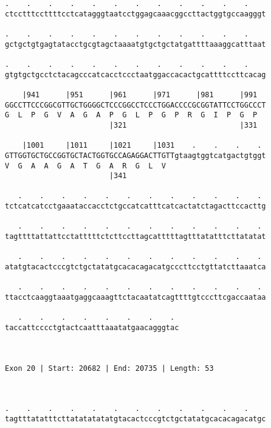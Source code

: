 \documentclass{article}
\begin{document}
\begin{Verbatim}
.    .    .    .    .    .    .    .    .    .    .    .    
ctcctttccttttcctcatagggtaatcctggagcaaacggccttactggtgccaagggt
                                                            
.    .    .    .    .    .    .    .    .    .    .    .    
gctgctgtgagtatacctgcgtagctaaaatgtgctgctatgattttaaaggcatttaat
                                                            
.    .    .    .    .    .    .    .    .    .    .    .    
gtgtgctgcctctacagcccatcacctccctaatggaccacactgcattttccttcacag
                                                            
    |941      |951      |961      |971      |981      |991  
GGCCTTCCCGGCGTTGCTGGGGCTCCCGGCCTCCCTGGACCCCGCGGTATTCCTGGCCCT
G  L  P  G  V  A  G  A  P  G  L  P  G  P  R  G  I  P  G  P  
                        |321                          |331  
  
    |1001     |1011     |1021     |1031    .    .    .    . 
GTTGGTGCTGCCGGTGCTACTGGTGCCAGAGGACTTGTTgtaagtggtcatgactgtggt
V  G  A  A  G  A  T  G  A  R  G  L  V                       
                        |341                                
  
   .    .    .    .    .    .    .    .    .    .    .    . 
tctcatcatcctgaaataccacctctgccatcatttcatcactatctagacttccacttg
                                                            
   .    .    .    .    .    .    .    .    .    .    .    . 
tagttttattattcctatttttctcttccttagcatttttagtttatatttcttatatat
                                                            
   .    .    .    .    .    .    .    .    .    .    .    . 
atatgtacactcccgtctgctatatgcacacagacatgcccttcctgttatcttaaatca
                                                            
   .    .    .    .    .    .    .    .    .    .    .    . 
ttacctcaaggtaaatgaggcaaagttctacaatatcagttttgtcccttcgaccaataa
                                                            
   .    .    .    .    .    .    .    . 
taccattcccctgtactcaatttaaatatgaacagggtac
                                        
                                        
 
Exon 20 | Start: 20682 | End: 20735 | Length: 53



.    .    .    .    .    .    .    .    .    .    .    .    
tagtttatatttcttatatatatatgtacactcccgtctgctatatgcacacagacatgc
                                                            

\end{Verbatim}
\end{document}
